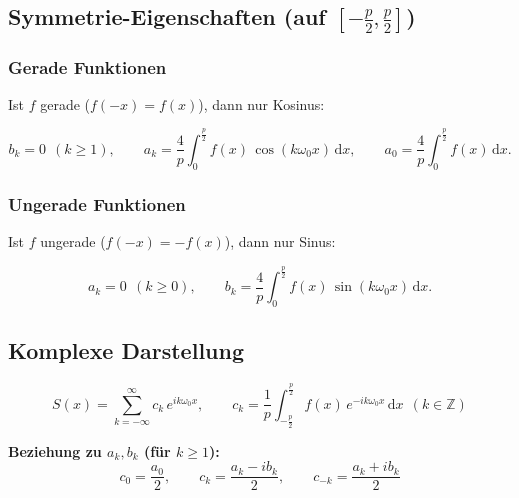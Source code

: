 \documentclass[a4paper,11pt,oneside,open=any,parskip=half, DIV=15]{scrreprt}
\begin{document}
   \subsection*{Symmetrie-Eigenschaften (auf \([-\tfrac p2,\tfrac p2]\))}
      \subsubsection*{Gerade Funktionen}
         Ist \(f\) gerade (\(f(-x)=f(x)\)), dann nur Kosinus:
         \begin{importantbox}
            \[
               b_k=0\ \ (k\ge 1),\qquad
               a_k=\frac{4}{p}\int_{0}^{\frac{p}{2}} f(x)\,\cos(k\omega_0 x)\,\mathrm{d}x,\qquad
               a_0=\frac{4}{p}\int_{0}^{\frac{p}{2}} f(x)\,\mathrm{d}x.
            \]
         \end{importantbox}

      \subsubsection*{Ungerade Funktionen}
         Ist \(f\) ungerade (\(f(-x)=-f(x)\)), dann nur Sinus:
         \begin{importantbox}
            \[
               a_k=0\ \ (k\ge 0),\qquad
               b_k=\frac{4}{p}\int_{0}^{\frac{p}{2}} f(x)\,\sin(k\omega_0 x)\,\mathrm{d}x.
            \]
         \end{importantbox}

      \subsection*{Komplexe Darstellung}
         \begin{importantbox}
            \[
               S(x)=\sum_{k=-\infty}^{\infty} c_k\,e^{ik\omega_0 x},
               \qquad
               c_k=\frac{1}{p}\int_{-\frac{p}{2}}^{\frac{p}{2}} f(x)\,e^{-ik\omega_0 x}\,\mathrm{d}x\ \ (k\in\mathbb{Z})
            \]
         \end{importantbox}
         \textbf{Beziehung zu \(a_k,b_k\) (für \(k\ge 1\)):}
         \[
            c_0=\frac{a_0}{2},\qquad
            c_k=\frac{a_k-i b_k}{2},\qquad
            c_{-k}=\frac{a_k+i b_k}{2}
         \]
\end{document}
